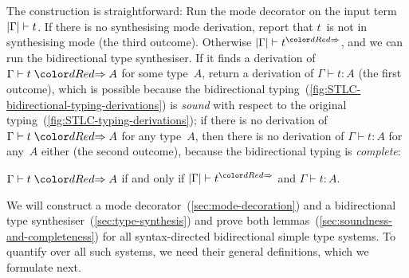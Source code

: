The construction is straightforward:
Run the mode decorator on the input term~$\left|\Gamma\right| \vdash t$.
If there is no synthesising mode derivation, report that $t$~is not in synthesising mode (the third outcome).
Otherwise $\erase\Gamma \vdash t^{\syn}$, and we can run the bidirectional type synthesiser.
If it finds a derivation of $\Gamma \vdash t \syn A$ for some type~$A$, return a derivation of $\Gamma \vdash t : A$ (the first outcome), which is possible because the bidirectional typing~(\cref{fig:STLC-bidirectional-typing-derivations}) is \emph{sound} with respect to the original typing~(\cref{fig:STLC-typing-derivations}); if there is no derivation of $\Gamma \vdash t \syn A$ for any type~$A$, then there is no derivation of $\Gamma \vdash t : A$ for any~$A$ either (the second outcome), because the bidirectional typing is \emph{complete}:
\begin{theorem}
$\Gamma \vdash t \syn A$ if and only if\/ $\erase\Gamma \vdash t^{\syn}$ and\/ $\Gamma \vdash t : A$.
\end{theorem}
%
%

We will construct a mode decorator~(\cref{sec:mode-decoration}) and a bidirectional type synthesiser~(\cref{sec:type-synthesis}) and prove both lemmas~(\cref{sec:soundness-and-completeness}) for all syntax-directed bidirectional simple type systems.
To quantify over all such systems, we need their general definitions, which we formulate next.

